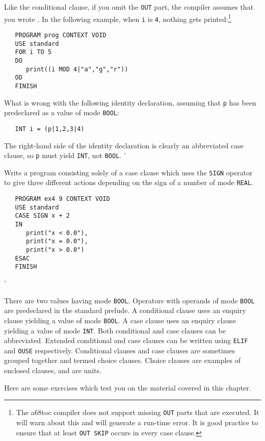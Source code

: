 Like the conditional clause, if you omit the \verb|OUT| part, the
compiler assumes that you wrote .  In the
following example, when \verb|i| is \verb|4|, nothing gets
printed:\footnote{The a68toc compiler does not support missing \texttt{OUT} parts that are executed.
It will warn about this and will generate a run-time
error.  It is good practice to ensure that at least \protect\texttt{OUT SKIP} occurs in
every case clause.}
\begin{verbatim}
   PROGRAM prog CONTEXT VOID
   USE standard
   FOR i TO 5
   DO
      print((i MOD 4|"a","g","r"))
   OD
   FINISH
\end{verbatim}

\begin{exercise}
\item What is wrong with the following identity declaration, assuming
that \verb|p| has been predeclared as a value of mode \verb|BOOL|:
\begin{verbatim}
   INT i = (p|1,2,3|4)
\end{verbatim}
\indent\ans The right-hand side of the identity declaration is
clearly an abbreviated case clause, so \verb|p| must yield
\verb|INT|, not \verb|BOOL|.
'
\item Write a program consisting solely of a case clause which uses
the \verb|SIGN| operator to give three different actions depending on
the sign of a number of mode \verb|REAL|. \ans \ %
\begin{verbatim}
   PROGRAM ex4 9 CONTEXT VOID
   USE standard
   CASE SIGN x + 2
   IN
      print("x < 0.0"),
      print("x = 0.0"),
      print("x > 0.0")
   ESAC
   FINISH
\end{verbatim}
'
\end{exercise}

There are two values having mode \verb|BOOL|. Operators with operands
of mode \verb|BOOL| are predeclared in the standard prelude.  A
conditional clause uses an enquiry clause yielding a value of mode
\verb|BOOL|.  A case clause uses an enquiry clause yielding a value
of mode \verb|INT|.  Both conditional and case clauses can be
abbreviated.  Extended conditional and case clauses can be written
using \verb|ELIF| and \verb|OUSE| respectively.  Conditional clauses
and case clauses are sometimes grouped together and termed choice
clauses. Choice clauses are examples of enclosed clauses, and are
units.

Here are some exercises which test you on the material covered in this
chapter.

